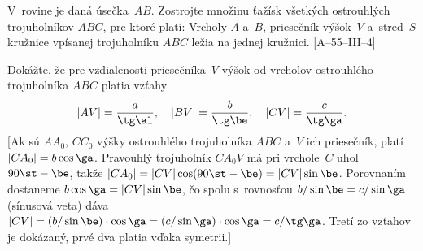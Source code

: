 {V~rovine je daná úsečka~$AB$. Zostrojte množinu ťažísk
všetkých ostrouhlých trojuholníkov $ABC$, pre ktoré platí:
Vrcholy $A$ a~$B$, priesečník výšok~$V$ a~stred~$S$ kružnice vpísanej
trojuholníku $ABC$ ležia na jednej kružnici. [A--55--III--4]

\D
Dokážte, že pre vzdialenosti priesečníka~$V$ výšok od vrcholov
ostrouhlého trojuholníka $ABC$ platia vzťahy
$$
|AV|=\frac{a}{\tg\al},\quad
|BV|=\frac{b}{\tg\be},\quad
|CV|=\frac{c}{\tg\ga}.
$$
[Ak sú $AA_0$, $CC_0$ výšky ostrouhlého trojuholníka $ABC$ a~$V$
ich priesečník, platí $|CA_0|=b\cos\ga$. Pravouhlý trojuholník
$CA_0V$ má pri vrchole~$C$ uhol $90\st-\be$, takže $|CA_0|=|CV|\cos(90\st-\be)=|CV|\sin\be$.
Porovnaním dostaneme $b\cos\ga=|CV|\sin\be$, čo spolu
s~rovnosťou $b/\sin\be=c/\sin\ga$ (sínusová veta) dáva
$|CV|=(b/\sin\be)\cdot\cos\ga=(c/\sin\ga)\cdot\cos\ga=c/\tg\ga$.
Tretí zo vzťahov je dokázaný, prvé dva platia vďaka symetrii.]
}


